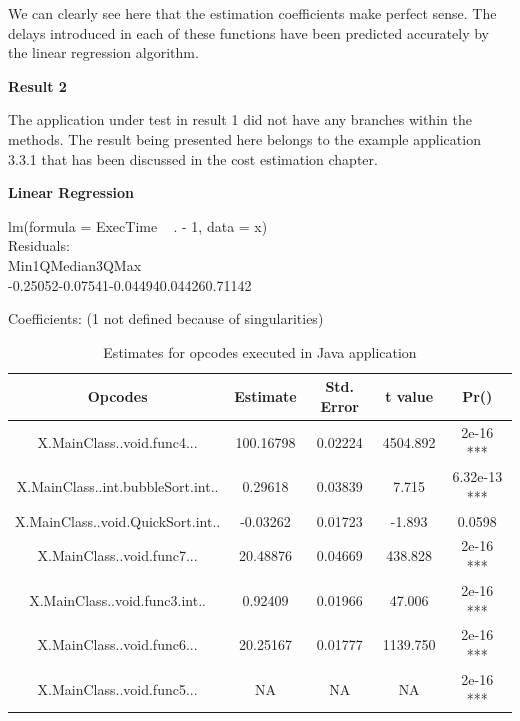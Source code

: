 \documentclass[11pt]{article}
\begin{document}
We can clearly see here that the estimation coefficients make perfect sense. The delays introduced in each of these functions have been predicted accurately by the linear regression algorithm. 

\textbf{Result 2}

The application under test in result 1 did not have any branches within the methods. The result being presented here belongs to the example application 3.3.1 that has been discussed in the cost estimation chapter. 

\textbf{Linear Regression}

lm(formula = ExecTime ~ . - 1, data = x)\\

Residuals:\\
Min\hspace{4em}1Q\hspace{4em}Median\hspace{3em}3Q\hspace{4em}Max \\
-0.25052\hspace{2em}-0.07541\hspace{2em}-0.04494\hspace{2em}0.04426\hspace{2em}0.71142 

Coefficients: (1 not defined because of singularities)\\
\begin{table}[h!]
\begin{center}
 \begin{tabular}{ |c|c|c|c|c| }
 \hline
 Opcodes&Estimate&Std. Error&t value&Pr()    \\
 \hline
X.MainClass..void.func4...&100.16798&0.02224&4504.892&2e-16 ***\\
X.MainClass..int.bubbleSort.int..&0.29618&0.03839&7.715&6.32e-13 ***\\
X.MainClass..void.QuickSort.int..&-0.03262&0.01723&-1.893&0.0598\\
X.MainClass..void.func7...&20.48876&0.04669&438.828&2e-16 ***\\
X.MainClass..void.func3.int..&0.92409&0.01966&47.006&2e-16 ***\\
X.MainClass..void.func6...&20.25167&0.01777&1139.750&2e-16 ***\\
X.MainClass..void.func5...&NA&NA&NA&2e-16 ***\\
\hline
\end{tabular}
\end{center}
\caption{Estimates for opcodes executed in Java application}
\label{Linear Regression results:4}
\end{table}
\end{document}
